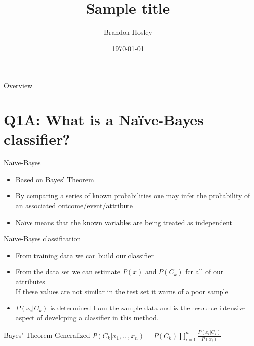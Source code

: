 \documentclass{beamer}
\title{Sample title}
\author{Brandon Hosley}
\institute{University of Illinois - Springfield}
\date{\today}
\begin{document}
\frame{\titlepage}

\begin{frame}{Overview}
\tableofcontents
\end{frame}

\section[Q1A]{Q1A: What is a Na\"{i}ve-Bayes classifier?}

\begin{frame}{Na\"{i}ve-Bayes}
	\begin{itemize}[<+->]
		\item Based on Bayes' Theorem
		\item By comparing a series of known probabilities one may infer the probability of an associated outcome/event/attribute
		\item Na\"{i}ve means that the known variables are being treated as independent
	\end{itemize}
	
\end{frame}
\begin{frame}{Na\"{i}ve-Bayes classification}
	\begin{itemize}[<+->]
		\item From training data we can build our classifier
		\item From the data set we can estimate $P(x)$ and $P(C_k)$
			for all of our attributes \\
			If these values are not similar in the test set it warns of a poor sample
		\item $P(x_i|C_k)$ is determined from the sample data and is the resource intensive aspect of developing a classifier in this method.
	\end{itemize}
	\begin{exampleblock}{Bayes' Theorem Generalized} 
		$P(C_k|x_1,\ldots,x_n)=P(C_k)\prod_{i=1}^{n} \frac{P(x_i|C_k)}{P(x_i)}$ 
	\end{exampleblock}
\end{frame}
\end{document}
